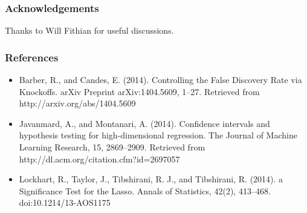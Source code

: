 \documentclass{beamer}
\begin{document}
\begin{frame}
\frametitle{Acknowledgements}
Thanks to Will Fithian for useful discussions.
\end{frame}

\begin{frame}
\frametitle{References}
\begin{itemize}
\item Barber, R., and Candes, E. (2014). Controlling the False Discovery Rate via Knockoffs. arXiv Preprint arXiv:1404.5609, 1–27. Retrieved from http://arxiv.org/abs/1404.5609
\item Javanmard, A., and Montanari, A. (2014). Confidence intervals and hypothesis testing for high-dimensional regression. The Journal of Machine Learning Research, 15, 2869–2909. Retrieved from http://dl.acm.org/citation.cfm?id=2697057
\item Lockhart, R., Taylor, J., Tibshirani, R. J., and Tibshirani, R. (2014). a Significance Test for the Lasso. Annals of Statistics, 42(2), 413–468. doi:10.1214/13-AOS1175
\end{itemize}
\end{frame}
\end{document}
